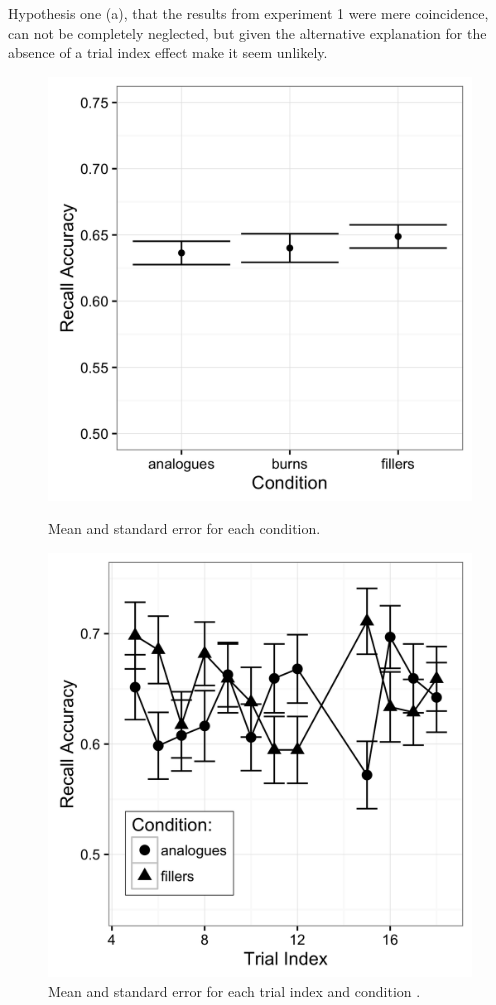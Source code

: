 \documentclass[a4paper,man,natbib,floatsintext,import]{apa6}
\begin{document}
Hypothesis one (a), that the results from experiment 1 were mere coincidence, can not be completely neglected, but given the alternative explanation for the absence of a trial index effect make it seem unlikely.

\begin{figure}
\begin{minipage}[t]{.5\textwidth}
\includegraphics[width=.9\linewidth]{figures/conf2_conditionWburn.png}
\caption{Mean and standard error for each condition.}
\label{fig:conf2_conditionWburn}
\end{minipage}
\begin{minipage}[t]{.5\textwidth}
\includegraphics[width=.9\linewidth]{figures/main2.png}
\caption{Mean and standard error for each trial index and condition .}
\label{fig:main2}
\end{minipage}
\end{figure}
\end{document}
